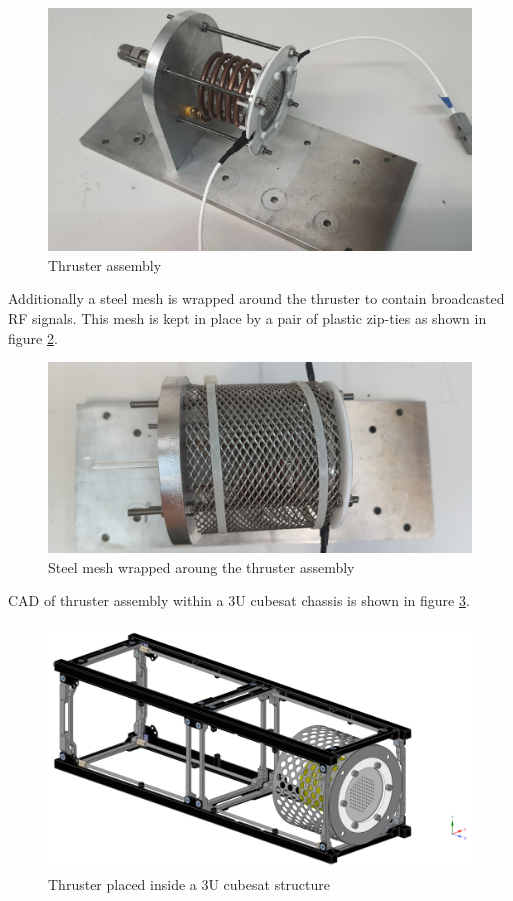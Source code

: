 \begin{figure}[ht]
    \centering
    \includegraphics[width=\linewidth]{fig/assm/real_assm.png}
    \caption{Thruster assembly}
    \label{fig:thrusterassmgenreal}
\end{figure}
 \newpage
Additionally a steel mesh is wrapped around the thruster to contain broadcasted RF signals. This mesh is kept in place by a pair of plastic zip-ties as shown in figure \ref{fig:mesh}.

\begin{figure}[ht]
    \centering
    \includegraphics[width=\linewidth]{fig/assm/assm_mesh.jpg}
    \caption{Steel mesh wrapped aroung the thruster assembly}
    \label{fig:mesh}
\end{figure}

CAD of thruster assembly within a 3U cubesat chassis is shown in figure \ref{fig:3u_inside}. 

\begin{figure}[ht]
    \centering
    \includegraphics[width=\linewidth]{fig/3Udims_inside_iso.png}
    \caption{Thruster placed inside a 3U cubesat structure}
    \label{fig:3u_inside}
\end{figure}


